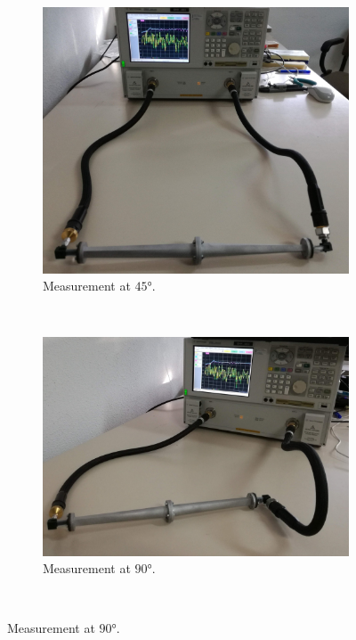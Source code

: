 \documentclass[english,twoside]{article}
\begin{document}
	\begin{figure}
    	\centering			
    	\begin{subfigure}[b]{0.48\textwidth}
    		\includegraphics[width=\textwidth]{figures/marie_photo_45}
    		\caption{Measurement at $\ang{45}$.}
    	\end{subfigure}
    	~
    	\begin{subfigure}[b]{0.48\textwidth}
    		\includegraphics[width=\textwidth]{figures/marie_photo_90}
    		\caption{Measurement at $\ang{90}$.}
    	\end{subfigure}
    	\vspace{10pt}\\

\end{figure}
\end{document}
